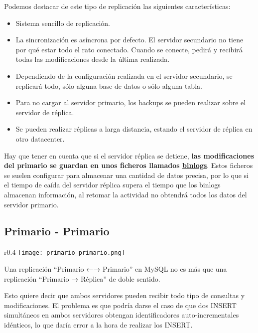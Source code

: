 Podemos destacar de este tipo de replicación las siguientes características:


\begin{itemize}
    \item Sistema sencillo de replicación.
    \item La sincronización es asíncrona por defecto. El servidor secundario no tiene por qué estar todo el rato conectado. Cuando se conecte, pedirá y recibirá todas las modificaciones desde la última realizada.
    \item Dependiendo de la configuración realizada en el servidor secundario, se replicará todo, sólo alguna base de datos o sólo alguna tabla.
    \item Para no cargar al servidor primario, los backups se pueden realizar sobre el servidor de réplica.
    \item Se pueden realizar réplicas a larga distancia, estando el servidor de réplica en otro datacenter.

\end{itemize}


Hay que tener en cuenta que si el servidor réplica se detiene, \textbf{las modificaciones del primario se guardan en unos ficheros llamados \underline{binlogs}}. Estos ficheros se suelen configurar para almacenar una cantidad de datos precisa, por lo que si el tiempo de caída del servidor réplica supera el tiempo que los binlogs almacenan información, al retomar la actividad no obtendrá todos los datos del servidor primario.



\subsection{Primario - Primario}
\begin{wrapfigure}{r}{0.4\linewidth}
    \centering
    \vspace{-50pt}
    \texttt{[image: primario\_primario.png]}
    \vspace{-30pt}
\end{wrapfigure}
Una replicación “Primario ←→ Primario” en MySQL no es más que una replicación “Primario → Réplica” de doble sentido.

Esto quiere decir que ambos servidores pueden recibir todo tipo de consultas y modificaciones. El problema es que podría darse el caso de que dos INSERT simultáneos en ambos servidores obtengan identificadores auto-incrementales idénticos, lo que daría error a la hora de realizar los INSERT.

